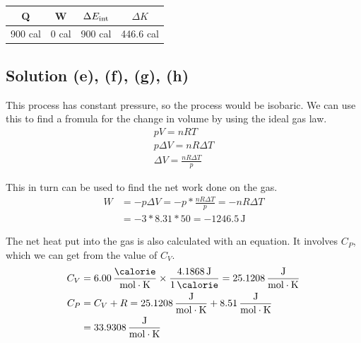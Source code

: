 \documentclass[12pt]{article}
\begin{document}
            \begin{center}
                \begin{tabular}{c | c | c | c}
                    Q   &   W   &   $\Delta E_{\rm int}$    &   $\Delta K$\\
                    \hline
                    900 cal   &   0 cal &   900 cal   &   446.6 cal
                \end{tabular}
            \end{center}

        \subsection{Solution (e), (f), (g), (h)}
            This process has constant pressure, so the process would be isobaric.
            We can use this to find a fromula for the change in volume by using the ideal gas law.
            \begin{gather}
                pV  =   nRT\\
                p\Delta V   =   nR \Delta T\\
                \Delta V    =   \frac{nR \Delta T}{p}
            \end{gather}

            This in turn can be used to find the net work done on the gas.
            \begin{align}
                W   &=  -p \Delta V
                    =   -p * \frac{nR \Delta T}{p}
                    =   -nR \Delta T\\
                    &=  -3 * 8.31 * 50
                    =   -1246.5\,\unit{\joule}
            \end{align}

            The net heat put into the gas is also calculated with an equation.
            It involves $C_P$, which we can get from the value of $C_V$.
            \begin{align}
                C_V &=  6.00\,\unit{\frac{\calorie}{\mole\cdot\kelvin}} \times \frac{4.1868\,\unit{\joule}}{1\,\unit{\calorie}}
                    =   25.1208\,\unit{\frac{\joule}{\mole\cdot\kelvin}}\\
                C_P &=  C_V + R
                    =   25.1208\,\unit{\frac{\joule}{\mole\cdot\kelvin}} + 8.51\,\unit{\frac{\joule}{\mole\cdot\kelvin}}\\
                    &=  33.9308\,\unit{\frac{\joule}{\mole\cdot\kelvin}}
            \end{align}
\end{document}
